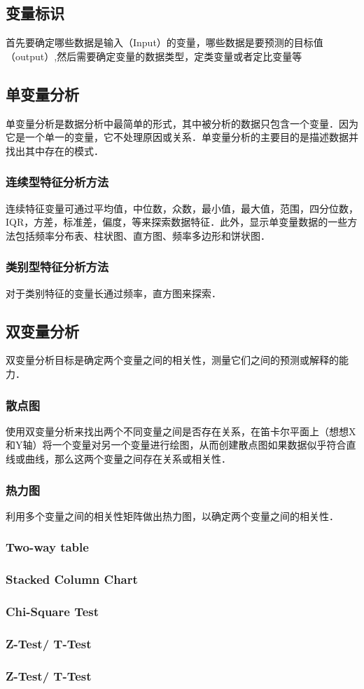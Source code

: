 \subsection{变量标识}
首先要确定哪些数据是输入（Input）的变量，哪些数据是要预测的目标值（output）,然后需要确定变量的数据类型，定类变量或者定比变量等
\subsection{单变量分析}
单变量分析是数据分析中最简单的形式，其中被分析的数据只包含一个变量．因为它是一个单一的变量，它不处理原因或关系．单变量分析的主要目的是描述数据并找出其中存在的模式．  
\subsubsection{连续型特征分析方法}
连续特征变量可通过平均值，中位数，众数，最小值，最大值，范围，四分位数，IQR，方差，标准差，偏度，等来探索数据特征．此外，显示单变量数据的一些方法包括频率分布表、柱状图、直方图、频率多边形和饼状图．
\subsubsection{类别型特征分析方法}
对于类别特征的变量长通过频率，直方图来探索．
\subsection{双变量分析}
双变量分析目标是确定两个变量之间的相关性，测量它们之间的预测或解释的能力．
\subsubsection{散点图}
使用双变量分析来找出两个不同变量之间是否存在关系，在笛卡尔平面上（想想X和Y轴）将一个变量对另一个变量进行绘图，从而创建散点图如果数据似乎符合直线或曲线，那么这两个变量之间存在关系或相关性．
\subsubsection{热力图}
利用多个变量之间的相关性矩阵做出热力图，以确定两个变量之间的相关性．
\subsubsection{Two-way table}
\subsubsection{Stacked Column Chart}
\subsubsection{Chi-Square Test}
\subsubsection{Z-Test/ T-Test}
\subsubsection{Z-Test/ T-Test}